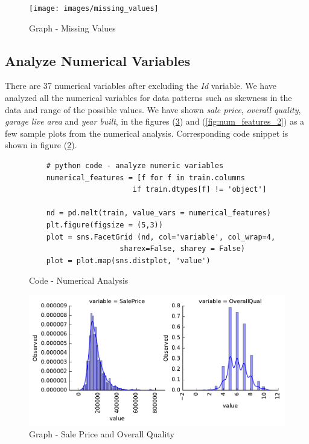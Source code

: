 \documentclass[sigconf]{acmart}
\begin{document}
	\begin{figure}[htb]
		\centering
		\texttt{[image: images/missing\_values]}	
		\caption{Graph - Missing Values} \label{fig:missing-values} 
	\end{figure}

	\subsection{Analyze Numerical Variables}
	There are 37 numerical variables after excluding the {\em Id} variable. We have analyzed all the numerical variables for data patterns such as skewness in the data and range of the possible values. We have shown {\em sale price}, {\em overall quality}, {\em garage live area} and {\em year built}, in the figures (\ref{fig:num-feature-1}) and (\ref{fig:num_features_2}) as a few sample plots from the numerical analysis. Corresponding code snippet is shown in figure (\ref{c:analyze-numeric}).
	
	\begin{figure}[htb]
	\begin{verbatim}
	# python code - analyze numeric variables
	numerical_features = [f for f in train.columns 
						if train.dtypes[f] != 'object']
	
	nd = pd.melt(train, value_vars = numerical_features)	
	plt.figure(figsize = (5,3))
	plot = sns.FacetGrid (nd, col='variable', col_wrap=4,
	                 sharex=False, sharey = False)
	plot = plot.map(sns.distplot, 'value')				
	\end{verbatim}
	\caption{Code - Numerical Analysis}\label{c:analyze-numeric}
	\end{figure}

	
	\begin{figure}[htb]
		\centering
		\includegraphics[width=0.75\columnwidth]{images/num_features_1}	
		\caption{Graph - Sale Price and Overall Quality}\label{fig:num-feature-1}		
	\end{figure}
\end{document}
